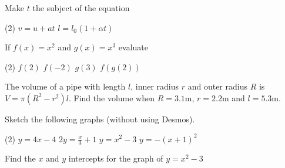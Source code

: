 \begin{Exercise}[title={Functions},label=ex12]
	\Question Make $t$ the subject of the equation
	\begin{tasks}(2)
		\task 	 $v =u +a t$%
		\task    $l =l_{0} \left (1 +\alpha  t\right )$%
	\end{tasks}
	
	\Question If $f (x) =x^{2}$ and $g (x) =x^{3}$ evaluate
	\begin{tasks}(2)
		\task 	 $f (2)$%
		\task    $f ( -2)$%
		\task 	 $g (3)$%
		\task    $f(g ( 2))$%
	\end{tasks}

	\Question The volume of a pipe with length $l$, inner radius $r$ and outer radius $R$ is $V =\pi  \left (R^{2} -r^{2}\right ) l\text{.}$ Find the volume when $R =3.1 \mbox{m}$, $r =2.2 \mbox{m}$ and $l =5.3 \mbox{m}\text{.}$%
	
	\Question Sketch the following graphs (without using Desmos).
	\begin{tasks}(2)
		\task 	 $y=4x-4$
		\task    $2y=\frac{x}{3}+1$	
		\task 	 $y =x^{2} -3$ 
		\task    $y =-(x+1)^{2}$ 
	\end{tasks}

\Question Find the $x$ and $y$ intercepts for the graph of $y =x^{2} -3$%


\end{Exercise}
